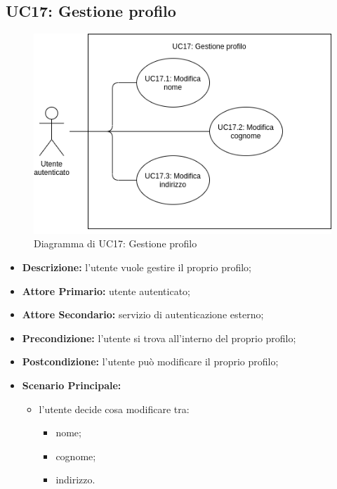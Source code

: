 \subsection{UC17: Gestione profilo}
\label{sec:UC17}
\begin{figure}[!ht]
    \caption{Diagramma di UC17: Gestione profilo}
    \vspace{10px}
    \includegraphics[scale=0.5]{../../../Images/AnalisiRequisiti/UC17}
    \centering
\end{figure}

\begin{itemize}
    \item \textbf{Descrizione:} l'utente vuole gestire il proprio profilo;
    \item \textbf{Attore Primario:} utente autenticato;
    \item \textbf{Attore Secondario:} servizio di autenticazione esterno;
    \item \textbf{Precondizione:} l'utente si trova all'interno del proprio profilo;
    \item \textbf{Postcondizione:} l'utente può modificare il proprio profilo;
    \item \textbf{Scenario Principale:}
          \begin{itemize}
              \item  l'utente decide cosa modificare tra:
                    \begin{itemize}
                        \item nome;
                        \item cognome;
                        \item indirizzo.
                    \end{itemize}
          \end{itemize}
\end{itemize}

